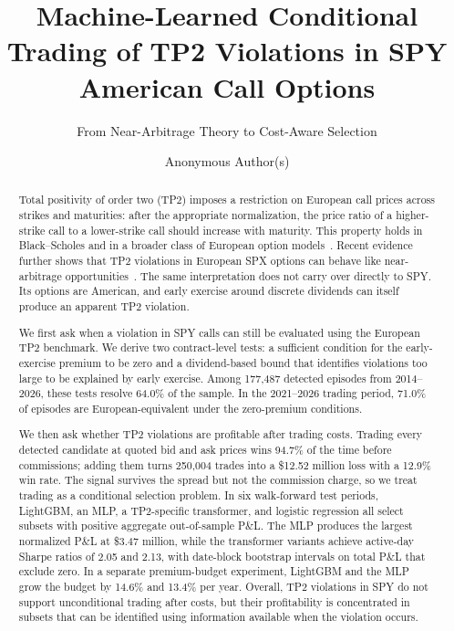 \documentclass[sigconf,review,anonymous]{acmart}
\begin{document}
\title{Machine-Learned Conditional Trading of TP2 Violations in SPY American Call Options}
\subtitle{From Near-Arbitrage Theory to Cost-Aware Selection}

\author{Anonymous Author(s)}

\renewcommand{\shortauthors}{Anonymous et al.}

\begin{abstract}
Total positivity of order two (TP2) imposes a restriction on European call prices across strikes and maturities: after the appropriate normalization, the price ratio of a higher-strike call to a lower-strike call should increase with maturity. This property holds in Black--Scholes and in a broader class of European option models~\cite{glasserman2026tp2theory}. Recent evidence further shows that TP2 violations in European SPX options can behave like near-arbitrage opportunities~\cite{glasserman2025tp2}. The same interpretation does not carry over directly to SPY. Its options are American, and early exercise around discrete dividends can itself produce an apparent TP2 violation.

We first ask when a violation in SPY calls can still be evaluated using the European TP2 benchmark. We derive two contract-level tests: a sufficient condition for the early-exercise premium to be zero and a dividend-based bound that identifies violations too large to be explained by early exercise. Among 177{,}487 detected episodes from 2014--2026, these tests resolve 64.0\% of the sample. In the 2021--2026 trading period, 71.0\% of episodes are European-equivalent under the zero-premium conditions.

We then ask whether TP2 violations are profitable after trading costs. Trading every detected candidate at quoted bid and ask prices wins 94.7\% of the time before commissions; adding them turns 250{,}004 trades into a \$12.52 million loss with a 12.9\% win rate. The signal survives the spread but not the commission charge, so we treat trading as a conditional selection problem. In six walk-forward test periods, LightGBM, an MLP, a TP2-specific transformer, and logistic regression all select subsets with positive aggregate out-of-sample P\&L. The MLP produces the largest normalized P\&L at \$3.47 million, while the transformer variants achieve active-day Sharpe ratios of 2.05 and 2.13, with date-block bootstrap intervals on total P\&L that exclude zero. In a separate premium-budget experiment, LightGBM and the MLP grow the budget by 14.6\% and 13.4\% per year. Overall, TP2 violations in SPY do not support unconditional trading after costs, but their profitability is concentrated in subsets that can be identified using information available when the violation occurs.
\end{abstract}
\end{document}
